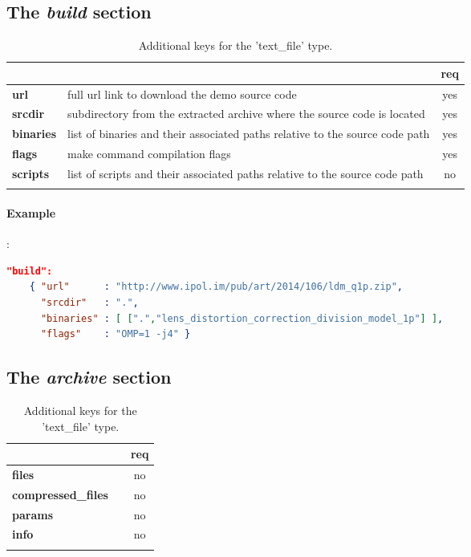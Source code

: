 \subsection{The \emph{build} section}

\begin{longtable}{|>{\bf}L{\linewidth}|L{\linewidth}|c|}
\hline
{}     &  & {\bf req} \tabularnewline 
\hline \hline
 url      & full url link to download the demo source code & yes \\ \hline
 srcdir   & subdirectory from the extracted archive where the source code is 
            located & yes \\ \hline
 binaries & list of binaries and their associated paths relative to the source 
            code path & yes \\ \hline
 flags    & make command compilation flags & yes \\ \hline
 scripts  & list of scripts and their associated paths relative to the source 
            code path & no  \\ \hline
\caption{Additional keys for the 'text\_file' type.}
\end{longtable}

\paragraph{Example}:\\
\begin{lstlisting}[language=json,firstnumber=1]
  "build":
    { "url"      : "http://www.ipol.im/pub/art/2014/106/ldm_q1p.zip", 
      "srcdir"   : ".",
      "binaries" : [ [".","lens_distortion_correction_division_model_1p"] ],
      "flags"    : "OMP=1 -j4" }
\end{lstlisting}

\subsection{The \emph{archive} section}

\begin{longtable}{|>{\bf}L{\linewidth}|L{\linewidth}|c|}
\hline
{}     &  & {\bf req} \tabularnewline 
\hline \hline
 files    &  & no \\ \hline
 compres\-sed\_\-files   &  & no \\ \hline
 params &  & no \\ \hline
 info    & & no \\ \hline
\caption{Additional keys for the 'text\_file' type.}
\end{longtable}


